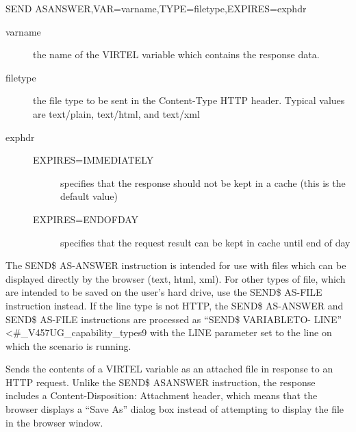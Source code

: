 \documentclass[letterpaper,10pt,english]{sphinxmanual}
\begin{document}
\begin{sphinxVerbatim}[commandchars=\\\{\}]
SEND\PYGZdl{} AS\PYGZhy{}ANSWER,VAR=\PYGZsq{}varname\PYGZsq{},TYPE=\PYGZsq{}filetype\PYGZsq{},EXPIRES=exphdr
\end{sphinxVerbatim}
\begin{description}
\item[{varname}] \leavevmode
the name of the VIRTEL variable which contains the response data.

\item[{filetype}] \leavevmode
the file type to be sent in the Content-Type HTTP header. Typical values are text/plain, text/html, and text/xml

\item[{exphdr}] \leavevmode\begin{description}
\item[{EXPIRES=IMMEDIATELY}] \leavevmode
specifies that the response should not be kept in a cache (this is the default value)

\item[{EXPIRES=ENDOFDAY}] \leavevmode
specifies that the request result can be kept in cache until end of day

\end{description}

\end{description}

The SEND\$ AS-ANSWER instruction is intended for use with files which can be displayed directly by the browser (text,
html, xml). For other types of file, which are intended to be saved on the user’s hard drive, use the SEND\$ AS-FILE
instruction instead.
If the line type is not HTTP, the SEND\$ AS-ANSWER and SEND\$ AS-FILE instructions are processed as “SEND\$ VARIABLETO-
LINE” \textless{}\#\_V457UG\_capability\_types9 with the LINE parameter set to the line on which the scenario is running.


Sends the contents of a VIRTEL variable as an attached file in response to an HTTP request. Unlike the SEND\$ ASANSWER
instruction, the response includes a Content-Disposition: Attachment header, which means that the browser
displays a “Save As” dialog box instead of attempting to display the file in the browser window.
\end{document}
